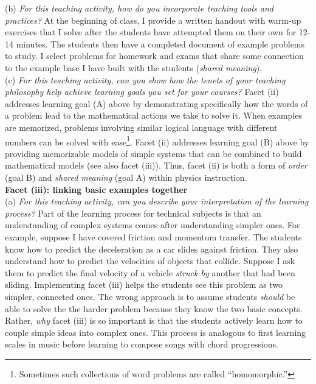 \documentclass[../../../main.tex]{subfiles}
\begin{document}
(b) \textit{For this teaching activity, how do you incorporate teaching tools and practices?}  At the beginning of class, I provide a written handout with warm-up exercises that I solve after the students have attempted them on their own for 12-14 minutes.  The students then have a completed document of example problems to study.  I select problems for homework and exams that share some connection to the example base I have built with the students (\textit{shared meaning}).
\\
\vspace{0.15cm}
(c) \textit{For this teaching activity, can you show how the tenets of your teaching philosophy help achieve learning goals you set for your courses?}  Facet (ii) addresses learning goal (A) above by demonstrating specifically how the words of a problem lead to the mathematical actions we take to solve it.  When examples are memorized, problems involving similar logical language with different numbers can be solved with ease\footnote{Sometimes such collections of word problems are called ``homomorphic.''}.  Facet (ii) addresses learning goal (B) above by providing memorizable models of simple systems that can be combined to build mathematical models (see also facet (iii)).  Thus, facet (ii) is both a form of \textit{order} (goal B) and \textit{shared meaning} (goal A) within physics instruction.
\\
\vspace{0.15cm}
\textbf{Facet (iii): linking basic examples together}
\\
\vspace{0.15cm}
(a) \textit{For this teaching activity, can you describe your interpretation of the learning process?} Part of the learning process for technical subjects is that an understanding of complex systems comes after understanding simpler ones.  For example, suppose I have covered friction and momentum transfer.  The students know how to predict the deceleration as a car slides against friction.  They also understand how to predict the velocities of objects that collide.  Suppose I ask them to predict the final velocity of a vehicle \textit{struck by} another that had been sliding. Implementing facet (iii) helps the students see this problem as two simpler, connected ones.  The wrong approach is to assume students \textit{should} be able to solve the the harder problem because they know the two basic concepts.  Rather, \textit{why} facet (iii) is so important is that the students actively learn how to couple simple ideas into complex ones.  This process is analogous to first learning scales in music before learning to compose songs with chord progressions.
\end{document}
